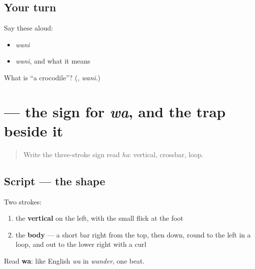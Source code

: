 \subsection*{Your turn}
Say these aloud:

\begin{itemize}
\raggedright
  \item \emph{wani}
  \item \emph{wani}, and what it means
\end{itemize}

\begin{tcolorbox}[breakable,colback=teal!4,colframe=teal!35!black,title={Before you move on}]
What is \textquotedblleft{}a crocodile\textquotedblright{}? (\textbf{}, \emph{wani}.)
\end{tcolorbox}
\section[\texorpdfstring{\ja{わ} (wa)}{わ (wa)}]{ — the sign for \emph{wa}, and the trap beside it}

\label{lesson:JA-W01-wa}



\begin{quote}
Write the three-stroke sign read \emph{ha}: vertical, crossbar, loop.
\end{quote}

\subsection*{Script — the shape}

\begin{quote}
\end{quote}

Two strokes:

\begin{enumerate}
\raggedright
  \item the \textbf{vertical} on the left, with the small flick at the foot
  \item the \textbf{body} — a short bar right from the top, then down, round to the left in a loop, and out to the lower right with a curl
\end{enumerate}

Read \textbf{wa}: like English \emph{wa} in \emph{wander}, one beat.

